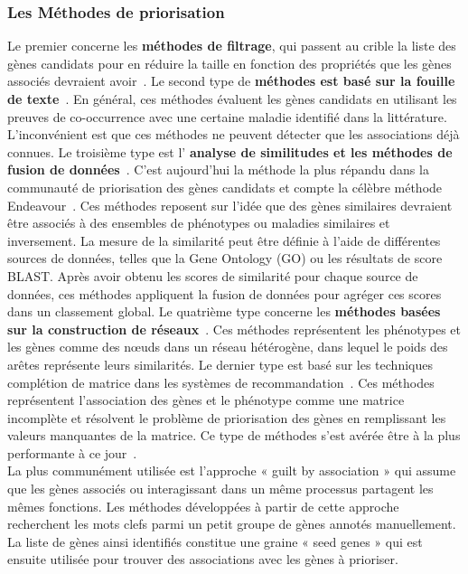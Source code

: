 \subsubsection*{Les Méthodes de priorisation}
Le premier concerne les \textbf{méthodes de filtrage}, qui passent au crible la liste des gènes candidats pour en réduire la taille en fonction des propriétés que les gènes associés devraient avoir~\cite{biofilter2009,mordelet2011,deo2014}. Le second type de \textbf{méthodes est basé sur la fouille de texte}~\cite{ElShal2016,onto2vec2018,opa2vec2018}. En général, ces méthodes évaluent les gènes candidats en utilisant les preuves de co-occurrence avec une certaine maladie identifié dans la littérature. L'inconvénient est que ces méthodes ne peuvent détecter que les associations déjà connues. Le troisième type est l' \textbf{analyse de similitudes et les méthodes de fusion de données}~\cite{aerts2006,tranchevent2007,chen2009,Li2010,farnoud2014,zitnik2015,zakeri2018,kumar2018}. C'est aujourd'hui la méthode la plus répandu dans la communauté de priorisation des gènes candidats et compte la célèbre méthode Endeavour~\cite{aerts2006}. Ces méthodes reposent sur l’idée que des gènes similaires devraient être associés à des ensembles de phénotypes ou maladies similaires et inversement. La mesure de la similarité peut être définie à l'aide de différentes sources de données, telles que la Gene Ontology (GO) ou les résultats de score BLAST. Après avoir obtenu les scores de similarité pour chaque source de données, ces méthodes appliquent la fusion de données pour agréger ces scores dans un classement global. Le quatrième type concerne les \textbf{méthodes basées sur la construction de réseaux}~\cite{yu2011,lee2011,li2012,Le2012,Le2013,kacprowski2013,singh-blom2013,rao2018}. Ces méthodes représentent les phénotypes et les gènes comme des nœuds dans un réseau hétérogène, dans lequel le poids des arêtes représente leurs similarités. Le dernier type est basé sur les techniques complétion de matrice dans les systèmes de recommandation~\cite{natarajan2014,zakeri2018}. Ces méthodes représentent l'association des gènes et le phénotype comme une matrice incomplète et résolvent le problème de priorisation des gènes en remplissant les valeurs manquantes de la matrice. Ce type de méthodes s'est avérée être à la plus performante à ce jour~\cite{zakeri2018}.\\

La plus communément utilisée est l’approche « guilt by association » qui assume que les gènes associés ou interagissant dans un même processus partagent les mêmes fonctions. Les méthodes développées à partir de cette approche recherchent les mots clefs parmi un petit groupe de gènes annotés manuellement. La liste de gènes ainsi identifiés constitue une graine « seed genes » qui est ensuite utilisée pour trouver des associations avec les gènes à prioriser. \\


